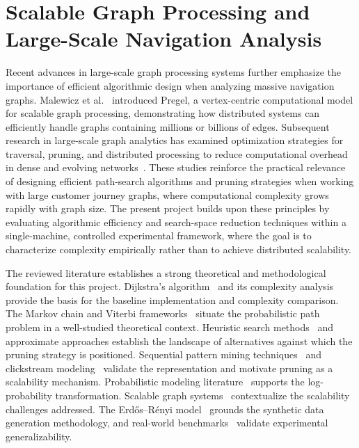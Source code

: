 \section{Scalable Graph Processing and Large-Scale Navigation Analysis}

Recent advances in large-scale graph processing systems further emphasize the importance of efficient algorithmic design when analyzing massive navigation graphs. Malewicz et al.~\citep{malewicz2010pregel} introduced Pregel, a vertex-centric computational model for scalable graph processing, demonstrating how distributed systems can efficiently handle graphs containing millions or billions of edges. Subsequent research in large-scale graph analytics has examined optimization strategies for traversal, pruning, and distributed processing to reduce computational overhead in dense and evolving networks~\citep{sahu2020scaling}. These studies reinforce the practical relevance of designing efficient path-search algorithms and pruning strategies when working with large customer journey graphs, where computational complexity grows rapidly with graph size. The present project builds upon these principles by evaluating algorithmic efficiency and search-space reduction techniques within a single-machine, controlled experimental framework, where the goal is to characterize complexity empirically rather than to achieve distributed scalability.

\vspace{0.5cm}

\noindent The reviewed literature establishes a strong theoretical and methodological foundation for this project. Dijkstra's algorithm~\citep{dijkstra1959} and its complexity analysis~\citep{cormen2009,fredman1987fibonacci} provide the basis for the baseline implementation and complexity comparison. The Markov chain and Viterbi frameworks~\citep{norris1998markov,viterbi1967error,rabiner1989hmm} situate the probabilistic path problem in a well-studied theoretical context. Heuristic search methods~\citep{hart1968astar,pearl1984heuristics} and approximate approaches establish the landscape of alternatives against which the pruning strategy is positioned. Sequential pattern mining techniques~\citep{pei2001prefixspan,han2007sequential} and clickstream modeling~\citep{bucklin2003clickstream,liu2011webmining} validate the representation and motivate pruning as a scalability mechanism. Probabilistic modeling literature~\citep{resnick1997recommender,manning2008nlp} supports the log-probability transformation. Scalable graph systems~\citep{malewicz2010pregel,sahu2020scaling} contextualize the scalability challenges addressed. The Erd\H{o}s--R\'{e}nyi model~\citep{erdosrenyi1960} grounds the synthetic data generation methodology, and real-world benchmarks~\citep{retailrocket2015,uci2008eshop} validate experimental generalizability.

